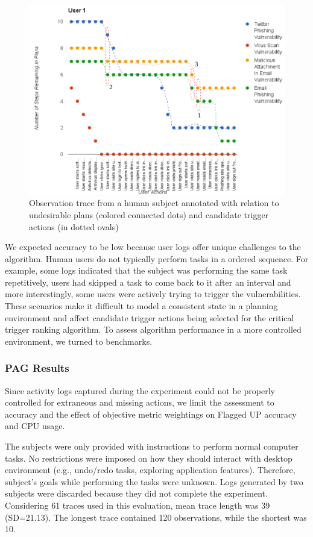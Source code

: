\begin{figure}[t!]
 \centerline{\includegraphics[width=\columnwidth, keepaspectratio=true]{img/user-study.png}}
 \caption{Observation trace from a human subject annotated with relation to undesirable plans (colored connected dots) and candidate trigger actions (in dotted ovals)}
 \label{fig:trace}
\end{figure}

We expected accuracy to be low because user logs offer unique challenges to the algorithm. Human users do not typically perform tasks in a ordered sequence. For example, some logs indicated that the subject was performing the same task repetitively, users had skipped a task to come back to it after an interval and more interestingly, some users were actively trying to trigger the vulnerabilities. These scenarios make it difficult to model a consistent state in a planning environment and affect candidate trigger actions being selected for the critical trigger ranking algorithm. To assess algorithm performance in a more controlled environment, we turned to benchmarks.


\subsubsection{PAG Results}
Since activity logs captured during the experiment could not be properly controlled for extraneous and missing actions, we limit the assessment to accuracy and the effect of objective metric weightings on Flagged UP accuracy and CPU usage.

The subjects were only provided with instructions to perform normal computer tasks. No restrictions were imposed on how they should interact with desktop environment (e.g., undo/redo tasks, exploring application features). Therefore, subject's goals while performing the tasks were unknown. Logs generated by two subjects were discarded because they did not complete the experiment. Considering 61 traces used in this evaluation, mean trace length was 39 (SD=21.13). The longest trace contained 120 observations, while the shortest was 10. 


